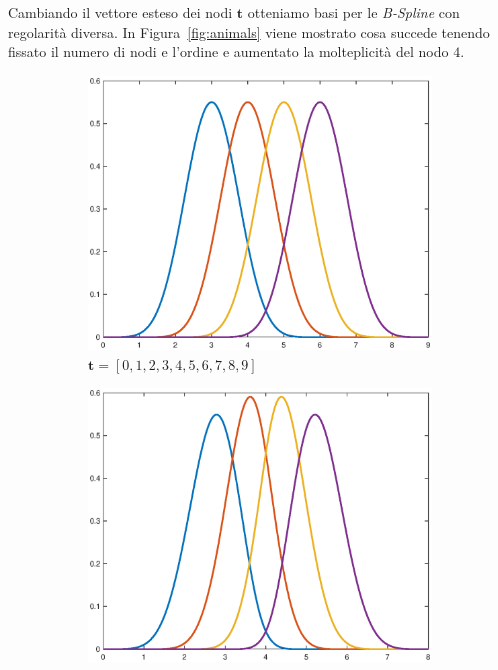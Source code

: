 \documentclass[a4paper, 12pt]{article}
\begin{document}
Cambiando il vettore esteso dei nodi $\mathbf{t}$ otteniamo basi per le \textit{B-Spline} con regolarità diversa.
In Figura~\ref{fig:animals} viene mostrato cosa succede tenendo fissato il numero di nodi e l'ordine e aumentato la molteplicità del nodo $4$.

\begin{figure}[]
  \centering
  \begin{subfigure}[b]{0.3\textwidth}
    \includegraphics[width=\textwidth]{figure/6_41.eps}
    \caption{$\mathbf{t} = [0, 1, 2, 3, 4, 5, 6, 7, 8, 9]$}
    \label{fig:641}
  \end{subfigure}
  \begin{subfigure}[b]{0.3\textwidth}
      \includegraphics[width=\textwidth]{figure/6_42.eps}

\end{subfigure}
\end{figure}
\end{document}
